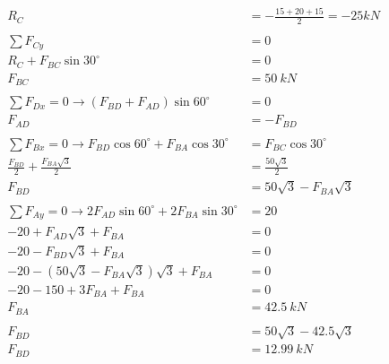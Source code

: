 \documentclass{article}
\begin{document}
\begin{align*}
    R_C                                                                   & = -\frac{15+20+15}{2} = -25kN \\
    \\
    \sum F_{Cy}                                                           & = 0                           \\
    R_C + F_{BC}\sin30^\circ                                              & = 0                           \\
    F_{BC}                                                                & = 50\ kN                      \\
    \\
    \sum F_{Dx} = 0 \rightarrow (F_{BD} + F_{AD})\sin60^\circ             & = 0                           \\
    F_{AD}                                                                & = -F_{BD}                     \\
    \\
    \sum F_{Bx} = 0 \rightarrow F_{BD}\cos60^\circ + F_{BA}\cos30^\circ   & = F_{BC}\cos30^\circ          \\
    \frac{F_{BD}}{2} + \frac{F_{BA}\sqrt{3}}{2}                           & = \frac{50\sqrt{3}}{2}        \\
    F_{BD}                                                                & = 50\sqrt{3}-F_{BA}\sqrt{3}   \\
    \\
    \sum F_{Ay} = 0 \rightarrow 2F_{AD}\sin60^\circ + 2F_{BA}\sin30^\circ & = 20                          \\
    -20 + F_{AD}\sqrt{3}  + F_{BA}                                        & = 0                           \\
    -20 - F_{BD}\sqrt{3}  + F_{BA}                                        & = 0                           \\
    -20 - (50\sqrt{3}-F_{BA}\sqrt{3})\sqrt{3}  + F_{BA}                   & = 0                           \\
    -20 - 150 + 3F_{BA} + F_{BA}                                          & = 0                           \\
    F_{BA}                                                                & = 42.5\ kN                    \\
    \\
    F_{BD}                                                                & = 50\sqrt{3}-42.5\sqrt{3}     \\
    F_{BD}                                                                & = 12.99\  kN                  \\
\end{align*}
\end{document}
